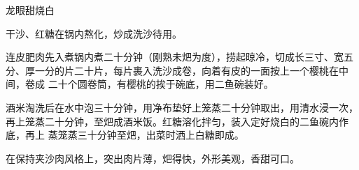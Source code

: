 \begin{recipe}{龙眼甜烧白}

\ingredients


\preparation

\step 干沙、红糖在锅内熬化，炒成洗沙待用。

\step 连皮肥肉先入煮锅内煮二十分钟（刚熟未𤆵为度），捞起晾冷，切成长三寸、宽五
分、厚一分的片二十片，每片裹入洗沙成卷，向着有皮的一面按上一个樱桃在中间，卷成
二十个圆卷筒，有樱桃的挨于碗底，用二鱼碗装好。

\step 酒米淘洗后在水中泡三十分钟，用净布垫好上笼蒸二十分钟取出，用清水浸一次，
再上笼蒸二十分钟，至𤆵成酒米饭。红糖溶化拌匀，装入定好烧白的二鱼碗内作底，再上
蒸笼蒸三十分钟至𤆵，出菜时洒上白糖即成。

\features

在保持夹沙肉风格上，突出肉片薄，𤆵得快，外形美观，香甜可口。

\end{recipe}

